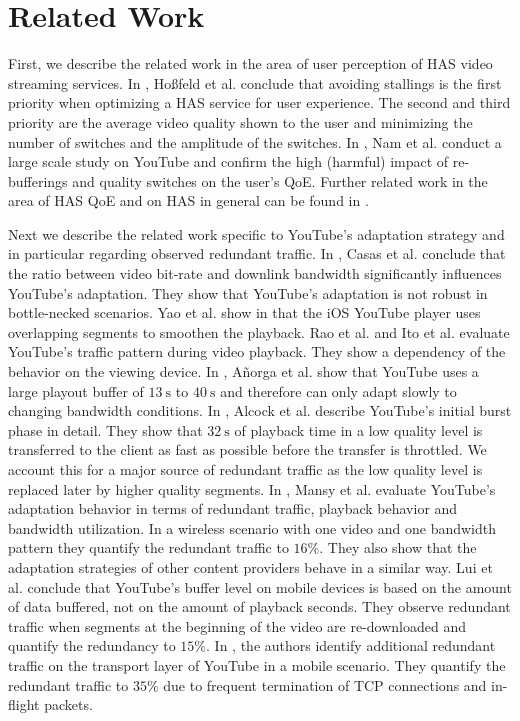 
\section{Related Work}
\label{sec:relatedwork}

First, we describe the related work in the area of user perception of HAS video streaming services.
In \cite{hossfeld2015identifying, hossfeld14assessingeffect}, Hoßfeld et al. conclude that avoiding stallings is the first priority when optimizing a HAS service for user experience. 
The second and third priority are the average video quality shown to the user and minimizing the number of switches and the amplitude of the switches.
In \cite{nam16qoe}, Nam et al. conduct a large scale study on YouTube and confirm the high (harmful) impact of re-bufferings and quality switches on the user's QoE.
Further related work in the area of HAS QoE and on HAS in general can be found in \cite{seufert2015survey}.

Next we describe the related work specific to YouTube's adaptation strategy and in particular regarding observed redundant traffic.
In \cite{casas2012youtube}, Casas et al. conclude that the ratio between video bit-rate and downlink bandwidth significantly influences YouTube's adaptation. 
They show that YouTube's adaptation is not robust in bottle-necked scenarios.
Yao et al. show in \cite{Yao2014b} that the iOS YouTube player uses overlapping segments to smoothen the playback.
Rao et al. \cite{rao2011network} and Ito et al. \cite{ito14networklevel} evaluate YouTube's traffic pattern during video playback. They show a dependency of the behavior on the viewing device.
In \cite{Anorga2015}, A\~norga et al. show that YouTube uses a large playout buffer of $\SI{13}{\second}$ to $\SI{40}{\second}$ and therefore can only adapt slowly to changing bandwidth conditions.
In \cite{alcock11application}, Alcock et al. describe YouTube's initial burst phase in detail. They show that $\SI{32}{\second}$ of playback time in a low quality level is transferred to the client as fast as possible before the transfer is throttled. We account this for a major source of redundant traffic as the low quality level is replaced later by higher quality segments.
In \cite{Mansy2014}, Mansy et al. evaluate YouTube's adaptation behavior in terms of redundant traffic, playback behavior and bandwidth utilization. In a wireless scenario with one video and one bandwidth pattern they quantify the redundant traffic to $16\%$. They also show that the adaptation strategies of other content providers behave in a similar way.
Lui et al. \cite{liu2013comparative} conclude that YouTube's buffer level on mobile devices is based on the amount of data buffered, not on the amount of playback seconds. They observe redundant traffic when segments at the beginning of the video are re-downloaded and quantify the redundancy to $15\%$.
In \cite{nam2013mobile}, the authors identify additional redundant traffic on the transport layer of YouTube in a mobile scenario. They quantify the redundant traffic to $35\%$ due to frequent termination of TCP connections and in-flight packets.
